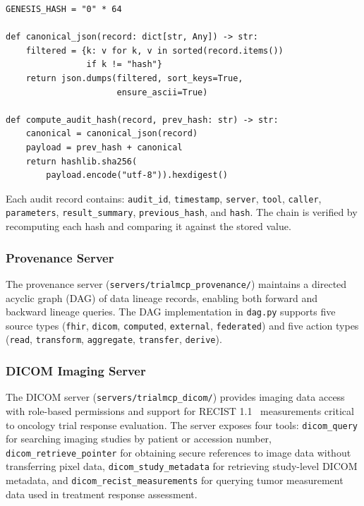 \begin{lstlisting}[caption={Hash-chained audit record computation from \texttt{servers/trialmcp\_ledger/chain.py}.},label={lst:chain}]
GENESIS_HASH = "0" * 64

def canonical_json(record: dict[str, Any]) -> str:
    filtered = {k: v for k, v in sorted(record.items())
                if k != "hash"}
    return json.dumps(filtered, sort_keys=True,
                      ensure_ascii=True)

def compute_audit_hash(record, prev_hash: str) -> str:
    canonical = canonical_json(record)
    payload = prev_hash + canonical
    return hashlib.sha256(
        payload.encode("utf-8")).hexdigest()
\end{lstlisting}

Each audit record contains: \texttt{audit\_id}, \texttt{timestamp}, \texttt{server}, \texttt{tool}, \texttt{caller}, \texttt{parameters}, \texttt{result\_summary}, \texttt{previous\_hash}, and \texttt{hash}. The chain is verified by recomputing each hash and comparing it against the stored value.

\subsubsection{Provenance Server}

The provenance server (\texttt{servers/trialmcp\_provenance/}) maintains a directed acyclic graph (DAG) of data lineage records, enabling both forward and backward lineage queries. The DAG implementation in \texttt{dag.py} supports five source types (\texttt{fhir}, \texttt{dicom}, \texttt{computed}, \texttt{external}, \texttt{federated}) and five action types (\texttt{read}, \texttt{transform}, \texttt{aggregate}, \texttt{transfer}, \texttt{derive}).

\subsubsection{DICOM Imaging Server}

The DICOM server (\texttt{servers/trialmcp\_dicom/}) provides imaging data access with role-based permissions and support for RECIST 1.1~\cite{eisenhauer2009recist} measurements critical to oncology trial response evaluation. The server exposes four tools: \texttt{dicom\_query} for searching imaging studies by patient or accession number, \texttt{dicom\_retrieve\_pointer} for obtaining secure references to image data without transferring pixel data, \texttt{dicom\_study\_metadata} for retrieving study-level DICOM metadata, and \texttt{dicom\_recist\_measurements} for querying tumor measurement data used in treatment response assessment.

